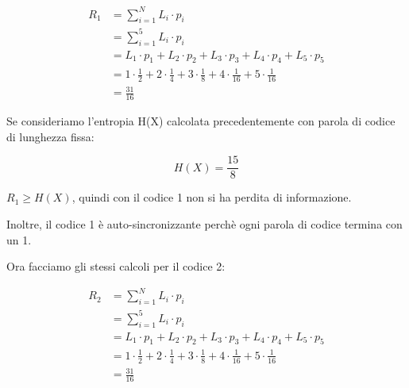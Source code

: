 {
    \Large 
    \begin{equation}
        \begin{split}
            R_1
            &= 
            \sum_{i = 1}^{N}
            L_i \cdot p_i 
            \\
            &= 
            \sum_{i = 1}^{5}
            L_i \cdot p_i
            \\
            &= 
            L_1 \cdot p_1
            +
            L_2 \cdot p_2
            +
            L_3 \cdot p_3 
            + 
            L_4 \cdot p_4 
            + 
            L_5 \cdot p_5
            \\
            &= 
            1 \cdot \frac{1}{2}
            +
            2 \cdot \frac{1}{4}
            +
            3 \cdot \frac{1}{8} 
            + 
            4 \cdot \frac{1}{16} 
            + 
            5 \cdot \frac{1}{16}
            \\
            &= 
            \frac{31}{16}
        \end{split}
    \end{equation}
}

Se consideriamo l'entropia H(X) calcolata precedentemente con parola di codice di lunghezza fissa: 

{
    \Large 
    \begin{equation}
        H (X) = \frac{15}{8}
    \end{equation}
}

$R_1 \ge H(X)$, quindi con il codice 1 non si ha perdita di informazione. \newline 

Inoltre, il codice 1 è auto-sincronizzante perchè ogni parola di codice termina con un 1. \newline 

Ora facciamo gli stessi calcoli per il codice 2:

{
    \Large 
    \begin{equation}
        \begin{split}
            R_2
            &= 
            \sum_{i = 1}^{N}
            L_i \cdot p_i 
            \\
            &= 
            \sum_{i = 1}^{5}
            L_i \cdot p_i
            \\
            &= 
            L_1 \cdot p_1
            +
            L_2 \cdot p_2
            +
            L_3 \cdot p_3 
            + 
            L_4 \cdot p_4 
            + 
            L_5 \cdot p_5
            \\
            &= 
            1 \cdot \frac{1}{2}
            +
            2 \cdot \frac{1}{4}
            +
            3 \cdot \frac{1}{8} 
            + 
            4 \cdot \frac{1}{16} 
            + 
            5 \cdot \frac{1}{16}
            \\
            &= 
            \frac{31}{16}
        \end{split}
    \end{equation}
}


